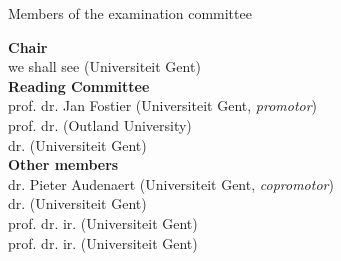 \cleardoublepage
\thispagestyle{empty}

\vspace*{\fill}
\Large
Members of the examination committee

\vspace{0.5cm}
\normalsize
\textbf{Chair} \\

we shall see (Universiteit Gent) \\

\textbf{Reading Committee} \\  

prof. dr. Jan Fostier (Universiteit Gent, \textit{promotor}) \\
prof. dr.  (Outland University) \\
dr.  (Universiteit Gent) \\

\textbf{Other members}  \\

dr. Pieter Audenaert (Universiteit Gent, \textit{copromotor}) \\
dr.  (Universiteit Gent) \\
prof. dr. ir.  (Universiteit Gent) \\
prof. dr. ir.  (Universiteit Gent) \\

\vspace*{\fill}
